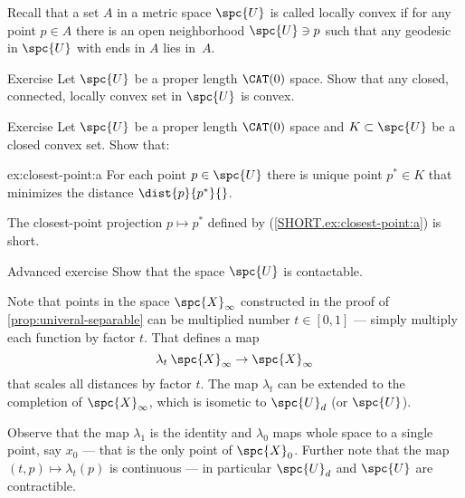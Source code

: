 Recall that a set $A$ in a metric space $\spc{U}$ is called locally convex if for any point $p\in A$ there is an open neighborhood $\spc{U}\ni p$ such that any geodesic in $\spc{U}$ with  ends in $A$ lies in~$A$. 

\begin{thm}{Exercise}\label{ex:locally-convex}
Let $\spc{U}$ be a proper length $\CAT(0)$ space.
Show that any closed, connected, locally convex set in $\spc{U}$ is convex.
\end{thm}

\begin{thm}{Exercise}\label{ex:closest-point}
Let  $\spc{U}$ be a proper length $\CAT(0)$ space 
and $K\subset \spc{U}$ be a closed convex set.
Show that: 

\begin{subthm}{ex:closest-point:a}
For each point $p\in \spc{U}$ there is unique point $p^*\in K$ that minimizes the distance $\dist{p}{p^*}{}$.
\end{subthm}

\begin{subthm}{}
The closest-point projection $p\mapsto p^*$ defined by (\ref{SHORT.ex:closest-point:a}) is short. 
\end{subthm}

\end{thm}




















\begin{thm}{Advanced exercise}\label{ex:urysohn-contractable}
 Show that the space $\spc{U}$ is contactable.
\end{thm}


Note that points in the space $\spc{X}_\infty$ constructed in the proof of \ref{prop:univeral-separable} can be multiplied number $t\in [0,1]$ --- simply multiply each function by factor $t$.
That defines a map 
\[\lambda_t\:\spc{X}_\infty\to \spc{X}_\infty\]
that scales all distances by factor $t$.
The map $\lambda_t$ can be extended to the completion of $\spc{X}_\infty$, which is isometic to $\spc{U}_d$ (or $\spc{U}$).

Observe that 
the map $\lambda_1$ is the identity  and $\lambda_0$ maps whole space to a single point, say $x_0$ --- that is the only point of $\spc{X}_0$.
Further note that the map $(t,p)\mapsto \lambda_t(p)$ is continuous ---  in particular $\spc{U}_d$ and $\spc{U}$ are contractible.\qeds

